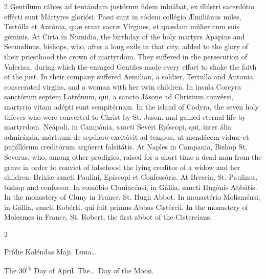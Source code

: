 \begin{paracol}{2}
 Gentílium rábies ad tentándam justórum fidem inhiábat, ex illústri 
 sacerdótio effécti sunt Mártyres gloriósi. Passi sunt in eódem 
 collégio Æmiliánus miles, Tertúlla et Antónia, quæ erant sacræ 
 Vírgines, et quædam múlier cum suis géminis.
\switchcolumn
{}
At Cirta in Numidia, the birthday 
 of the holy martyrs Apapius and Secundinus, bishops, who, after a long exile 
 in that city, added to the glory of their priesthood the crown of martyrdom. 
 They suffered in the persecution of Valerian, during which the enraged 
 Gentiles made every effort to shake the faith of the just. In their 
 company suffered Aemilian, a soldier, Tertulla and Antonia, consecrated 
 virgins, and a woman with her twin children.
\switchcolumn*
{}
In ínsula Corcyra 
 sanctórum septem Latrónum, qui, a sancto Jásone ad Christum convérsi, 
 martyrio vitam adépti sunt sempitérnam.
\switchcolumn
{}
In the island of Codyra, the seven 
 holy thieves who were converted to Christ by St. Jason, and gained eternal 
 life by martyrdom.
\switchcolumn*
{}
Neápoli, in Campánia, 
 sancti Sevéri Epíscopi, qui, inter ália admiránda, mórtuum de sepúlcro 
 excitávit ad tempus, ut mendácem víduæ et pupíllórum creditórum argúeret 
 falsitátis.
\switchcolumn
{}
At Naples in Campania, Bishop St. 
 Severus, who, among other prodigies, raised for a short time a dead man from 
 the grave in order to convict of falsehood the lying creditor of a widow and 
 her children.
\switchcolumn*
{}
Bríxiæ sancti Paulíni, 
 Epíscopi et Confessóris.
\switchcolumn
{}
At Brescia, St. Paulinus, bishop 
 and confessor.
\switchcolumn*
{}
In cœnóbio Cluniacénsi, 
 in Gállia, sancti Hugónis Abbátis.
\switchcolumn
{}
In the monastery of Cluny in 
 France, St. Hugh Abbot.
\switchcolumn*
{}
In monastério 
 Molisménsi, in Gállia, sancti Robérti, qui fuit primus Abbas Cistércii.
\switchcolumn
{}
In the monastery of Molesmes in 
 France, St. Robert, the first abbot of the Cistercians.
\switchcolumn*
{}
\end{paracol}


\begin{paracol}{2}
\begin{center}{\color{gregoriocolor} Prídie Kaléndas Maji. 
 Luna\dots\ }\end{center}
\switchcolumn
{}
\begin{center}{\color{gregoriocolor} The 
 30\textsuperscript{th} Day of April. The\dots\ Day of the Moon.}\end{center}
\end{paracol}

